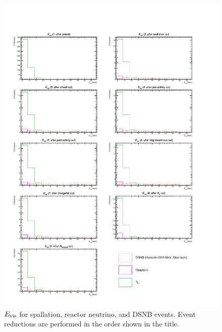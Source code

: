 \begin{figure}[h]
	\centering
	\includegraphics[width=15cm]{PDF/Dist_Nuebar/Che_50deg_tag_ge1/erec}
	\caption[$E_{\rm vis}$ for spallation, reactor neutrino, and DSNB events]{
	$E_{\rm vis}$ for spallation, reactor neutrino, and DSNB events.
	Event reductions are performed in the order shown in the title.
	}\label{Nuebar_erec}
\end{figure}

